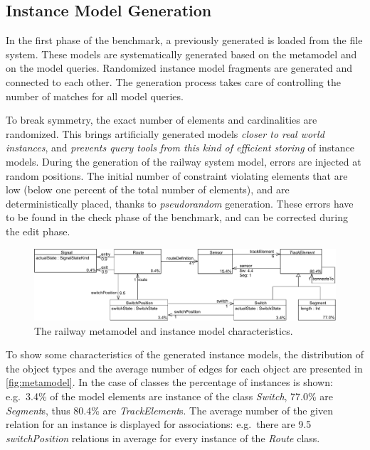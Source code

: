 \subsection{Instance Model Generation}
\label{sec:instanceGeneration}

In the first phase of the benchmark, a previously generated  is loaded from the file system. These models are systematically generated based on the metamodel and on the model queries. Randomized instance model fragments are generated and connected to each other. The generation process takes care of controlling the number of matches for all model queries.

To break symmetry, the exact number of elements and cardinalities are randomized. This brings artificially generated models \emph{closer to real world instances}, and \emph{prevents query tools from this kind of efficient storing} of instance models. During the generation of the railway system model, errors are injected at random positions. The initial number of constraint violating elements that are low (below one percent of the total number of elements), and are deterministically placed, thanks to \emph{pseudorandom} generation. These errors have to be found in the check phase of the benchmark, and can be corrected during the edit phase.

\begin{figure}[htb]
\begin{center}
\includegraphics[width=\textwidth]{figures/instance/TrainMMb.pdf}
\caption{The railway metamodel and instance model characteristics.}
\label{fig:metamodel-instance-characteristics}
\end{center}
\end{figure}

To show some characteristics of the generated instance models, the distribution of the object types and the average number of edges for each object are presented in \autoref{fig:metamodel}. In the case of classes the percentage of instances is shown: e.g.\ 3.4\% of the model elements are instance of the class \emph{Switch}, 77.0\% are \emph{Segment}s, thus 80.4\% are \emph{TrackElement}s. The average number of the given relation for an instance is displayed for associations: e.g.\ there are 9.5 \emph{switchPosition} relations in average for every instance of the \emph{Route} class.
